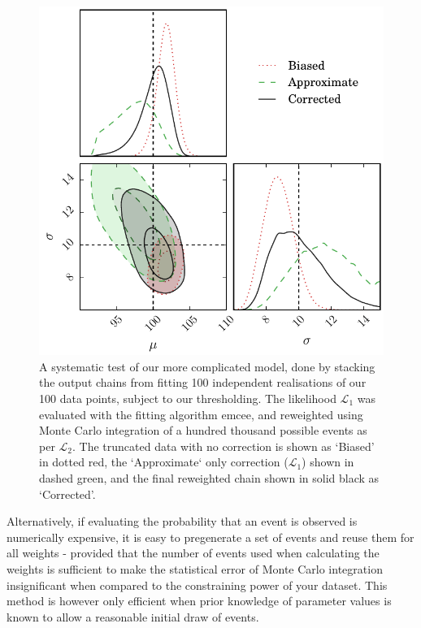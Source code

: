 \documentclass[a4paper,fleqn,usenatbib]{mnras}
\begin{document}
\begin{figure}
	\begin{center}
		\includegraphics[width=\columnwidth]{example/real.pdf}
	\end{center}
	\caption{A systematic test of our more complicated model, done by stacking the output chains from fitting 100 independent realisations of our 100 data points, subject to our thresholding. The likelihood $\mathcal{L}_1$ was evaluated with the fitting algorithm emcee, and reweighted using Monte Carlo integration of a hundred thousand possible events as per $\mathcal{L}_2$. The truncated data with no correction is shown as `Biased' in dotted red, the `Approximate` only correction ($\mathcal{L}_1$) shown in dashed green, and the final reweighted chain shown in solid black as `Corrected'.}
	\label{fig:real}
\end{figure}

Alternatively, if evaluating the probability that an event is observed is numerically expensive, it is easy to pregenerate a set of events and reuse them for all weights - provided that the number of events used when calculating the weights is sufficient to make the statistical error of Monte Carlo integration insignificant when compared to the constraining power of your dataset. This method is however only efficient when prior knowledge of parameter values is known to allow a reasonable initial draw of events.
\end{document}
